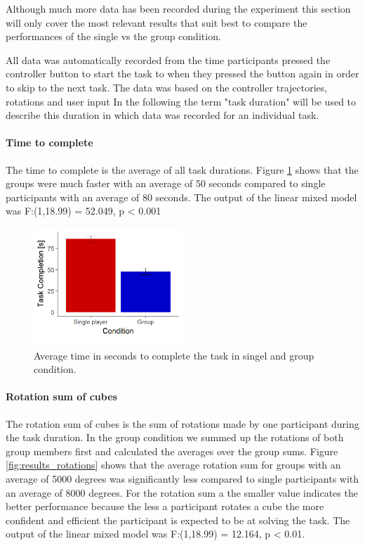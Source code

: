 \documentclass{article}
\begin{document}
 Although much more data has been recorded during the experiment this section will only cover the most relevant results that suit best to compare the performances of the single vs the group condition. 
 
 All data was automatically recorded from the time participants pressed the controller button to start the task to when they pressed the button again in order to skip to the next task. The data was based on the controller trajectories, rotations and user input  In the following the term "task duration" will be used to describe this duration in which data was recorded for an individual task.

\paragraph{Time to complete}
The time to complete is the average of all task durations.  Figure \ref{fig:results_duration} shows that the groups were much faster with an average of 50 seconds compared to single participants with an average of 80 seconds. The output of the linear mixed model was F:(1,18.99) = 52.049, p < 0.001 

\begin{figure}[h]
\centering
\includegraphics[width=0.5\textwidth]{results_duration}
\caption{Average time in seconds to complete the task in singel and group condition.} \label{fig:results_duration}
\end{figure}

\paragraph{Rotation sum of cubes}
The rotation sum of cubes is the sum of rotations made by one participant during the task duration. In the group condition we summed up the rotations of both group members first and calculated the averages over the group sums. Figure \ref{fig:results_rotations} shows that the average rotation sum for groups with an average of 5000 degrees was significantly less compared to single participants with an average of 8000 degrees. For the rotation sum a the smaller value indicates the better performance because the less a participant rotates a cube the more confident and efficient the participant is expected to be at solving the task. The output of the linear mixed model was F:(1,18.99) = 12.164, p < 0.01.
\end{document}
